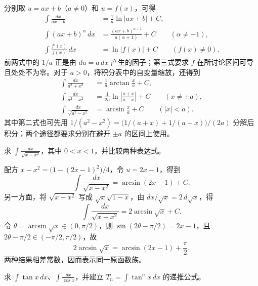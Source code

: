 \documentclass[UTF8,12pt,a4paper,fontset=fandol]{ctexbook}
\begin{document}
分别取 $u=ax+b$（$a\neq0$）和 $u=f(x)$，可得
\begin{align*}
    \int\frac{dx}{ax+b}&=\frac1a\ln|ax+b|+C,\\
    \int(ax+b)^\alpha\,dx
        &=\frac{(ax+b)^{\alpha+1}}{a(\alpha+1)}+C
        \qquad(\alpha\neq-1),\\
    \int\frac{f'(x)}{f(x)}\,dx&=\ln|f(x)|+C
        \qquad(f(x)\neq0).
\end{align*}
前两式中的 $1/a$ 正是由 $du=a\,dx$ 产生的因子；第三式要求 $f$ 在所讨论区间可导且处处不为零。对于 $a>0$，将积分表中的自变量缩放，还得到
\begin{align}
    \int\frac{dx}{a^2+x^2}&=\frac1a\arctan\frac xa+C,
       \label{eq:scaled-arctangent-integral}\\
    \int\frac{dx}{a^2-x^2}&=\frac1{2a}\ln\left|\frac{a+x}{a-x}\right|+C
       \qquad(x\neq\pm a),\label{eq:difference-of-squares-integral}\\
    \int\frac{dx}{\sqrt{a^2-x^2}}&=\arcsin\frac xa+C
       \qquad(|x|<a).\label{eq:scaled-arcsine-integral}
\end{align}
其中第二式也可先用 $1/(a^2-x^2)=\bigl(1/(a+x)+1/(a-x)\bigr)/(2a)$ 分解后积分；两个途径都要求分别在避开 $\pm a$ 的区间上使用。

\begin{example}
\label{ex:two-substitutions-for-square-root-integral}
求 $\displaystyle\int\frac{dx}{\sqrt{x-x^2}}$，其中 $0<x<1$，并比较两种表达式。
\end{example}

\begin{solve}
配方 $x-x^2=\bigl(1-(2x-1)^2\bigr)/4$，令 $u=2x-1$，得到
\[
    \int\frac{dx}{\sqrt{x-x^2}}=\arcsin(2x-1)+C.
\]
另一方面，将 $\sqrt{x-x^2}$ 写成 $\sqrt{x}\sqrt{1-x}$，由 $dx/\sqrt{x}=2\,d\sqrt{x}$，得
\[
    \int\frac{dx}{\sqrt{x-x^2}}=2\arcsin\sqrt{x}+C.
\]
令 $\theta=\arcsin\sqrt{x}\in(0,\pi/2)$，则 $\sin(2\theta-\pi/2)=2x-1$，且 $2\theta-\pi/2\in(-\pi/2,\pi/2)$，故
\[
    2\arcsin\sqrt{x}=\arcsin(2x-1)+\frac\pi2.
\]
两种结果相差常数，因而表示同一原函数族。
\end{solve}

\begin{example}
\label{ex:tangent-secant-integrals-and-recurrence}
求 $\displaystyle\int\tan x\,dx$、$\displaystyle\int\frac{dx}{\cos x}$，并建立 $T_n=\int\tan^n x\,dx$ 的递推公式。
\end{example}
\end{document}

